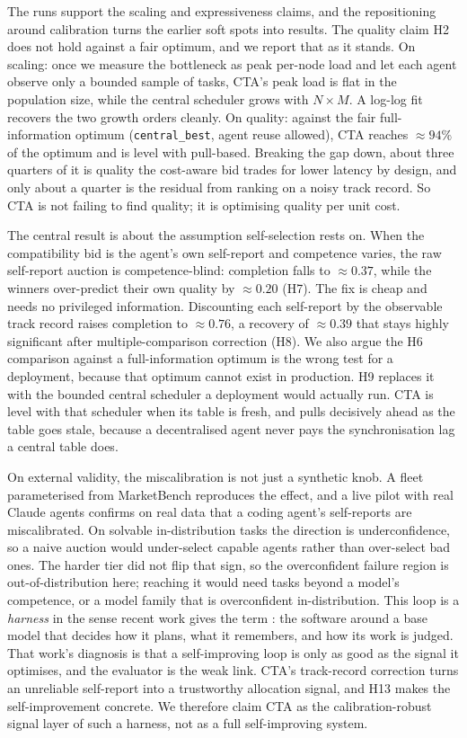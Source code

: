 \documentclass[11pt]{article}
\newcommand{\code}[1]{\texttt{#1}}
\begin{document}
The runs support the scaling and expressiveness claims, and the repositioning around calibration turns the earlier soft spots into results. The quality claim H2 does not hold against a fair optimum, and we report that as it stands. On scaling: once we measure the bottleneck as peak per-node load and let each agent observe only a bounded sample of tasks, CTA's peak load is flat in the population size, while the central scheduler grows with $N\times M$. A log-log fit recovers the two growth orders cleanly. On quality: against the fair full-information optimum (\code{central\_best}, agent reuse allowed), CTA reaches $\approx 94\%$ of the optimum and is level with pull-based. Breaking the gap down, about three quarters of it is quality the cost-aware bid trades for lower latency by design, and only about a quarter is the residual from ranking on a noisy track record. So CTA is not failing to find quality; it is optimising quality per unit cost.

The central result is about the assumption self-selection rests on. When the compatibility bid is the agent's own self-report and competence varies, the raw self-report auction is competence-blind: completion falls to $\approx 0.37$, while the winners over-predict their own quality by $\approx 0.20$ (H7). The fix is cheap and needs no privileged information. Discounting each self-report by the observable track record raises completion to $\approx 0.76$, a recovery of $\approx 0.39$ that stays highly significant after multiple-comparison correction (H8). We also argue the H6 comparison against a full-information optimum is the wrong test for a deployment, because that optimum cannot exist in production. H9 replaces it with the bounded central scheduler a deployment would actually run. CTA is level with that scheduler when its table is fresh, and pulls decisively ahead as the table goes stale, because a decentralised agent never pays the synchronisation lag a central table does.

On external validity, the miscalibration is not just a synthetic knob. A fleet parameterised from MarketBench reproduces the effect, and a live pilot with real Claude agents confirms on real data that a coding agent's self-reports are miscalibrated. On solvable in-distribution tasks the direction is underconfidence, so a naive auction would under-select capable agents rather than over-select bad ones. The harder tier did not flip that sign, so the overconfident failure region is out-of-distribution here; reaching it would need tasks beyond a model's competence, or a model family that is overconfident in-distribution. This loop is a \emph{harness} in the sense recent work gives the term \citep{weng2026harness}: the software around a base model that decides how it plans, what it remembers, and how its work is judged. That work's diagnosis is that a self-improving loop is only as good as the signal it optimises, and the evaluator is the weak link. CTA's track-record correction turns an unreliable self-report into a trustworthy allocation signal, and H13 makes the self-improvement concrete. We therefore claim CTA as the calibration-robust signal layer of such a harness, not as a full self-improving system.
\end{document}
